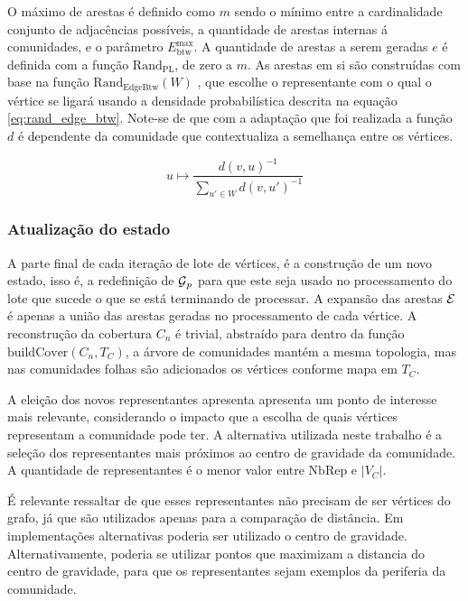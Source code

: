 \documentclass[notes.tex]{subfiles}
\begin{document}
O máximo de arestas é definido como $m$ sendo o mínimo entre a cardinalidade conjunto de adjacências possíveis, a quantidade de arestas internas á comunidades, e o parâmetro $E_\text{btw}^\text{max}$.
A quantidade de arestas a serem geradas $e$ é  definida com a função $\text{Rand}_\text{PL}$, de zero a $m$.
As arestas em si são construídas com base na função $\text{Rand}_\text{EdgeBtw}(W)$ \cite{largeron2015generating}, que escolhe o representante com o qual o vértice se ligará usando a densidade probabilística descrita na equação \ref{eq:rand_edge_btw}.
Note-se de que com a adaptação que foi realizada a função $d$ é dependente da comunidade que contextualiza a semelhança entre os vértices.

\begin{equation}\label{eq:rand_edge_btw}
    u \mapsto \frac{d(v, u)^{-1}}{\displaystyle\sum_{u' \in W}d(v, u')^{-1}}
\end{equation}

\subsubsection{Atualização do estado}

A parte final de cada iteração de lote de vértices, é a construção de um novo estado, isso é, a redefinição de $\operatorname{\mathcal{G}}_p$ para que este seja usado no processamento do lote que sucede o que se está terminando de processar.
A expansão das arestas  $\operatorname{\mathcal{E}}$ é apenas a união das arestas geradas no processamento de cada vértice.
A reconstrução da cobertura  $C_n$ é trivial, abstraído para dentro da função $\text{buildCover}(C_n, T_C)$, a árvore de comunidades mantém a mesma topologia, mas nas comunidades folhas são adicionados os vértices conforme mapa em $T_C$. 

A eleição dos novos representantes apresenta apresenta um ponto de interesse mais relevante, considerando o impacto que a escolha de quais vértices representam a comunidade pode ter.
A alternativa utilizada neste trabalho é a seleção dos representantes mais próximos ao centro de gravidade da comunidade.
A quantidade de representantes é o menor valor entre $\text{NbRep}$ e $|V_C|$.

É relevante ressaltar de que esses representantes não precisam de ser vértices do grafo, já que são utilizados apenas para a comparação de distância.
Em implementações alternativas poderia ser utilizado o centro de gravidade.
Alternativamente, poderia se utilizar pontos que maximizam a distancia do centro de gravidade, para que os representantes sejam exemplos da periferia da comunidade.
\end{document}
